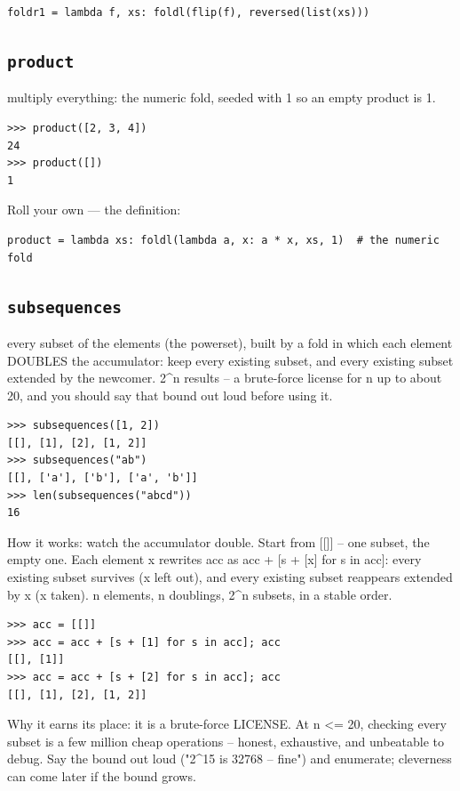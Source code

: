 \documentclass[10pt,letterpaper]{book}
\begin{document}
\begin{lstlisting}[style=ex]
foldr1 = lambda f, xs: foldl(flip(f), reversed(list(xs)))
\end{lstlisting}

\subsection{\texttt{product}}\label{def:product}
multiply everything: the numeric fold, seeded with 1 so an empty product is 1.
\begin{lstlisting}[style=ex]
>>> product([2, 3, 4])
24
>>> product([])
1
\end{lstlisting}

Roll your own --- the definition:

\begin{lstlisting}[style=ex]
product = lambda xs: foldl(lambda a, x: a * x, xs, 1)  # the numeric fold
\end{lstlisting}
\subsection{\texttt{subsequences}}\label{def:subsequences}
every subset of the elements (the powerset), built by a fold in which each element DOUBLES the accumulator: keep every existing subset, and every existing subset extended by the newcomer. 2\^{}n results -- a brute-force license for n up to about 20, and you should say that bound out loud before using it.
\begin{lstlisting}[style=ex]
>>> subsequences([1, 2])
[[], [1], [2], [1, 2]]
>>> subsequences("ab")
[[], ['a'], ['b'], ['a', 'b']]
>>> len(subsequences("abcd"))
16
\end{lstlisting}

How it works: watch the accumulator double. Start from [[]] -- one subset, the empty one. Each element x rewrites acc as acc + [s + [x] for s in acc]: every existing subset survives (x left out), and every existing subset reappears extended by x (x taken). n elements, n doublings, 2\^{}n subsets, in a stable order.

\begin{lstlisting}[style=ex]
>>> acc = [[]]
>>> acc = acc + [s + [1] for s in acc]; acc
[[], [1]]
>>> acc = acc + [s + [2] for s in acc]; acc
[[], [1], [2], [1, 2]]
\end{lstlisting}

Why it earns its place: it is a brute-force LICENSE. At n <= 20, checking every subset is a few million cheap operations -- honest, exhaustive, and unbeatable to debug. Say the bound out loud ("2\^{}15 is 32768 -- fine") and enumerate; cleverness can come later if the bound grows.
\end{document}
